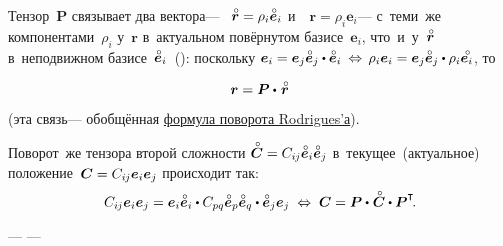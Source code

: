 \begin{otherlanguage}{russian}
\vspace{-0.4em} Тензор~$\bm{P}$ связывает два вектора\:--- ~${\mathcircabove{\bm{r}} = \rho_i \mathcircabove{\bm{e}}_i}$ и~~${\bm{r} = \rho_i \bm{e}_i}$\:--- с~теми~же компонентами~$\rho_i$ у~$\bm{r}$ в~актуальном повёрнутом базисе~${\bm{e}_i}$, что~и~у~${\mathcircabove{\bm{r}}}$ в~неподвижном базисе~${\mathcircabove{\bm{e}}_i}$~(): поскольку ${\bm{e}_i = \bm{e}_j \mathcircabove{\bm{e}}_j \dotp \mathcircabove{\bm{e}}_i \:\Leftrightarrow\, \rho_i \bm{e}_i = \bm{e}_j \mathcircabove{\bm{e}}_j \dotp \rho_i \mathcircabove{\bm{e}_i}}$, то

\nopagebreak\begin{equation}\label{rodriguesrotationformula}
\bm{r} = \bm{P} \dotp\hspace{.2ex} \mathcircabove{\bm{r}}
\end{equation}

\vspace{-0.4em} \noindent(эта связь\:--- обобщённая \href{https://fr.wikipedia.org/wiki/Rotation_vectorielle#Cas_g%C3%A9n%C3%A9ral}{формула поворота Rodrigues’а}).

\vspace{-0.1em}Поворот~же тензора второй сложности ${\mathcircabove{\bm{C}} = C_{i\hspace{-0.1ex}j} \mathcircabove{\bm{e}}_i \mathcircabove{\bm{e}}_j}$ в~текущее~(актуальное) положение~${\bm{C} = C_{i\hspace{-0.1ex}j} \bm{e}_i \bm{e}_j}$ происходит так:
\begin{equation}
C_{i\hspace{-0.1ex}j} \bm{e}_i \bm{e}_j = \bm{e}_i \mathcircabove{\bm{e}}_i \dotp C_{pq} \mathcircabove{\bm{e}}_p \mathcircabove{\bm{e}}_q \dotp \mathcircabove{\bm{e}}_j \bm{e}_j \;\Leftrightarrow\; \bm{C} = \bm{P} \dotp\hspace{.1ex} \mathcircabove{\bm{C}} \dotp \bm{P}^{\T} \hspace{-0.32ex}.
\end{equation}

\end{otherlanguage}

 \:--- \:--- 

